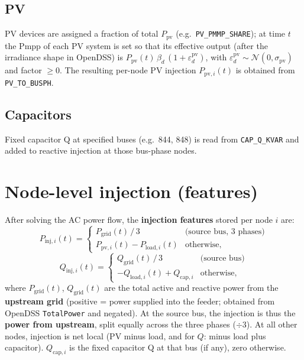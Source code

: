 \documentclass[11pt]{article}
\begin{document}
\subsection{PV}

PV devices are assigned a fraction of total $P_{\mathrm{pv}}$ (e.g.\ \texttt{PV\_PMMP\_SHARE}); at time $t$ the Pmpp of each PV system is set so that its effective output (after the irradiance shape in OpenDSS) is $P_{\mathrm{pv}}(t)\, \beta_d\, (1+\varepsilon_d^{\mathrm{pv}})$, with $\varepsilon_d^{\mathrm{pv}} \sim \mathcal{N}(0, \sigma_{\mathrm{pv}})$ and factor $\ge 0$. The resulting per-node PV injection $P_{\mathrm{pv},i}(t)$ is obtained from \texttt{PV\_TO\_BUSPH}.

\subsection{Capacitors}

Fixed capacitor Q at specified buses (e.g.\ 844, 848) is read from \texttt{CAP\_Q\_KVAR} and added to reactive injection at those bus-phase nodes.

\section{Node-level injection (features)}

After solving the AC power flow, the \textbf{injection features} stored per node $i$ are:
\begin{equation}
  P_{\mathrm{inj},i}(t) =
  \begin{cases}
    P_{\mathrm{grid}}(t)\,/\,3 & \text{(source bus, 3 phases)} \\
    P_{\mathrm{pv},i}(t) - P_{\mathrm{load},i}(t) & \text{otherwise},
  \end{cases}
\end{equation}
\begin{equation}
  Q_{\mathrm{inj},i}(t) =
  \begin{cases}
    Q_{\mathrm{grid}}(t)\,/\,3 & \text{(source bus)} \\
    -Q_{\mathrm{load},i}(t) + Q_{\mathrm{cap},i} & \text{otherwise},
  \end{cases}
\end{equation}
where $P_{\mathrm{grid}}(t)$, $Q_{\mathrm{grid}}(t)$ are the total active and reactive power from the \textbf{upstream grid} (positive = power supplied into the feeder; obtained from OpenDSS \texttt{TotalPower} and negated). At the source bus, the injection is thus the \textbf{power from upstream}, split equally across the three phases ($\div 3$). At all other nodes, injection is net local (PV minus load, and for $Q$: minus load plus capacitor). $Q_{\mathrm{cap},i}$ is the fixed capacitor Q at that bus (if any), zero otherwise.
\end{document}
